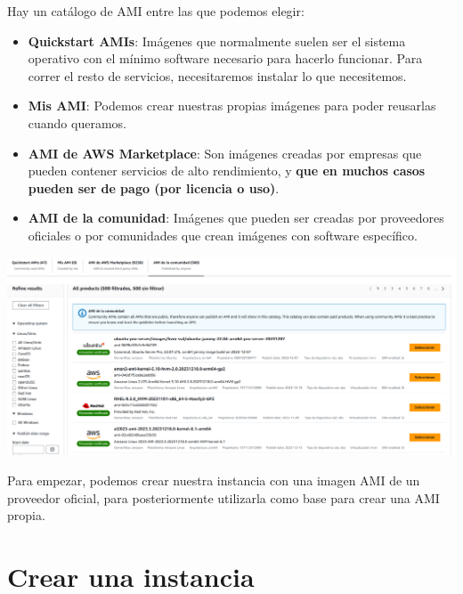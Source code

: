 Hay un catálogo de AMI entre las que podemos elegir:

\begin{itemize}
	\item \textbf{Quickstart AMIs}: Imágenes que normalmente suelen ser el sistema operativo con el mínimo software necesario para hacerlo funcionar. Para correr el resto de servicios, necesitaremos instalar lo que necesitemos.
	
	\item \textbf{Mis AMI}: Podemos crear nuestras propias imágenes para poder reusarlas cuando queramos.
	
	\item \textbf{AMI de AWS Marketplace}: Son imágenes creadas por empresas que pueden contener servicios de alto rendimiento, y \textbf{que en muchos casos pueden ser de pago (por licencia o uso)}.
	
	\item \textbf{AMI de la comunidad}: Imágenes que pueden ser creadas por proveedores oficiales o por comunidades que crean imágenes con software específico.
\end{itemize}

\begin{center}
	\includegraphics[frame,width=\linewidth]{img/aws/ec2_ami_catalogue.png}
\end{center}





Para empezar, podemos crear nuestra instancia con una imagen AMI de un proveedor oficial, para posteriormente utilizarla como base para crear una AMI propia.


\section{Crear una instancia}

